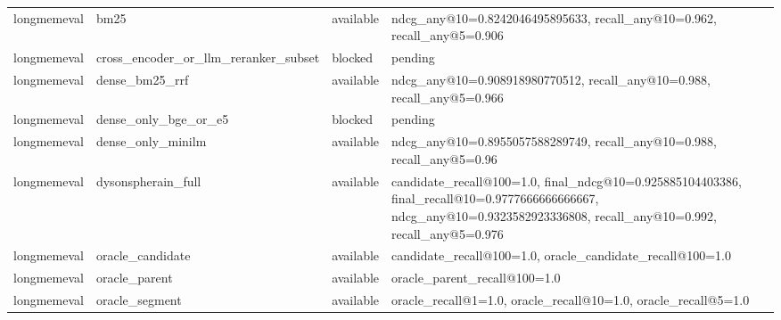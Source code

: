\begin{tabular}{llll}
longmemeval & bm25 & available & ndcg_any@10=0.8242046495895633, recall_any@10=0.962, recall_any@5=0.906 \\
longmemeval & cross_encoder_or_llm_reranker_subset & blocked & pending \\
longmemeval & dense_bm25_rrf & available & ndcg_any@10=0.908918980770512, recall_any@10=0.988, recall_any@5=0.966 \\
longmemeval & dense_only_bge_or_e5 & blocked & pending \\
longmemeval & dense_only_minilm & available & ndcg_any@10=0.8955057588289749, recall_any@10=0.988, recall_any@5=0.96 \\
longmemeval & dysonspherain_full & available & candidate_recall@100=1.0, final_ndcg@10=0.925885104403386, final_recall@10=0.9777666666666667, ndcg_any@10=0.9323582923336808, recall_any@10=0.992, recall_any@5=0.976 \\
longmemeval & oracle_candidate & available & candidate_recall@100=1.0, oracle_candidate_recall@100=1.0 \\
longmemeval & oracle_parent & available & oracle_parent_recall@100=1.0 \\
longmemeval & oracle_segment & available & oracle_recall@1=1.0, oracle_recall@10=1.0, oracle_recall@5=1.0 \\
\bottomrule
\end{tabular}
